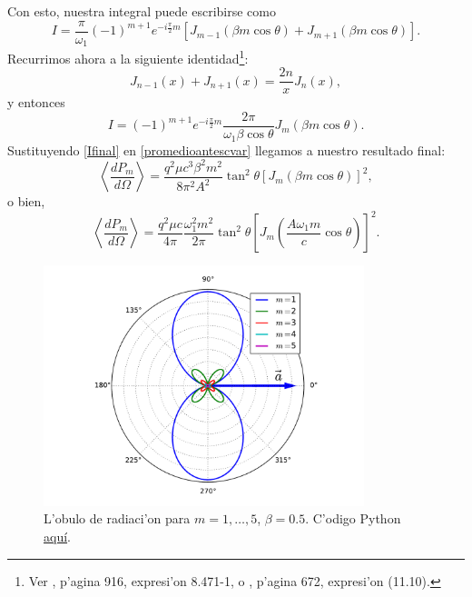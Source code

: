 Con esto, nuestra integral puede escribirse como
\begin{equation}
I=\frac{\pi}{\omega_1}(-1)^{m+1}e^{-i\frac{\pi}{2}m}\left[J_{m-1}\left(\beta
m\cos\theta\right)+J_{m+1}\left(\beta m\cos\theta\right)  \right]  .
\end{equation}
Recurrimos ahora a la siguiente identidad\footnote{Ver \cite{GR00}, p'agina 916, expresi'on 8.471-1, o \cite{AW01}, p'agina 672, expresi'on (11.10).}:
\begin{equation}
J_{n-1}(x)  +J_{n+1}(x)  =\frac{2n}{x}J_{n}\left(
x\right)  ,
\end{equation}
y entonces
\begin{equation}\label{Ifinal}
I=(-1)^{m+1}e^{-i\frac{\pi}{2}m}\frac{2\pi}{\omega_1\beta\cos\theta}J_{m}\left(  \beta m\cos\theta\right).
\end{equation}
Sustituyendo \eqref{Ifinal} en \eqref{promedioantescvar} llegamos a nuestro
resultado final:
\begin{equation}
\left\langle \frac{dP_{m}}{d\Omega}\right\rangle
=\frac{q^2\mu c^3\beta^2m^2}{8\pi^2 A^2}\tan^2\theta\left[J_{m}\left(\beta
m\cos\theta\right)\right]^2,
\end{equation}
o bien,
\begin{equation}
\boxed{\left\langle \frac{dP_{m}}{d\Omega}\right\rangle
=\frac{q^2\mu c}{4\pi}\frac{\omega_1^2m^2}{2\pi}\tan^2\theta\left[ J_{m}\left(\frac{A\omega_1
m}{c}\cos\theta\right)  \right]^2.}
\end{equation}
\begin{figure}[ht]
\centerline{\includegraphics[height=7cm]{fig/fig-mas.pdf}}
\caption{L'obulo de radiaci'on para $m=1,\dots,5$, $\beta=0.5$. C'odigo Python \href{https://github.com/gfrubi/electrodinamica/blob/master/figuras-editables/fig-mas.py}{aqu\'i}.}
\label{TER2}
\end{figure}
